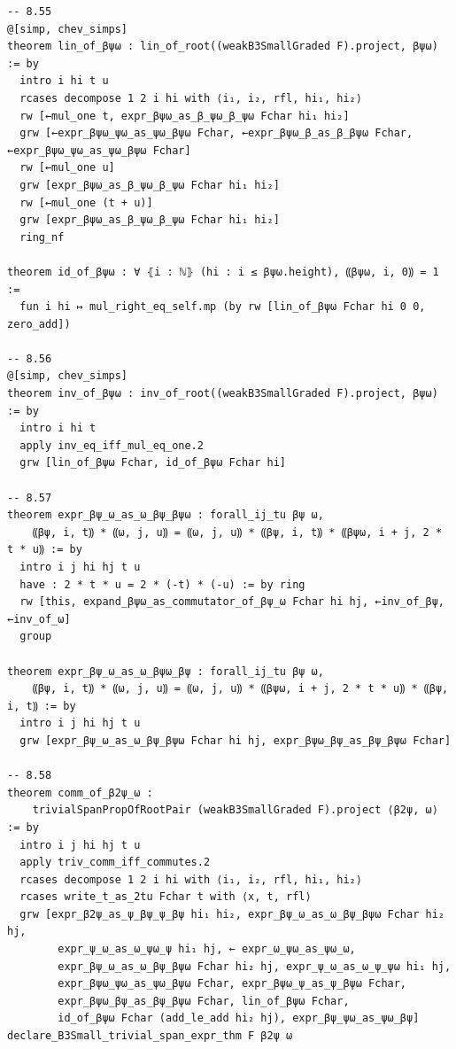 \documentclass[10pt,a4paper]{article}
\begin{document}
\begin{Verbatim}
-- 8.55
@[simp, chev_simps]
theorem lin_of_βψω : lin_of_root((weakB3SmallGraded F).project, βψω) := by
  intro i hi t u
  rcases decompose 1 2 i hi with ⟨i₁, i₂, rfl, hi₁, hi₂⟩
  rw [←mul_one t, expr_βψω_as_β_ψω_β_ψω Fchar hi₁ hi₂]
  grw [←expr_βψω_ψω_as_ψω_βψω Fchar, ←expr_βψω_β_as_β_βψω Fchar, ←expr_βψω_ψω_as_ψω_βψω Fchar]
  rw [←mul_one u]
  grw [expr_βψω_as_β_ψω_β_ψω Fchar hi₁ hi₂]
  rw [←mul_one (t + u)]
  grw [expr_βψω_as_β_ψω_β_ψω Fchar hi₁ hi₂]
  ring_nf

theorem id_of_βψω : ∀ ⦃i : ℕ⦄ (hi : i ≤ βψω.height), ⸨βψω, i, 0⸩ = 1 :=
  fun i hi ↦ mul_right_eq_self.mp (by rw [lin_of_βψω Fchar hi 0 0, zero_add])

-- 8.56
@[simp, chev_simps]
theorem inv_of_βψω : inv_of_root((weakB3SmallGraded F).project, βψω) := by
  intro i hi t
  apply inv_eq_iff_mul_eq_one.2
  grw [lin_of_βψω Fchar, id_of_βψω Fchar hi]

-- 8.57
theorem expr_βψ_ω_as_ω_βψ_βψω : forall_ij_tu βψ ω,
    ⸨βψ, i, t⸩ * ⸨ω, j, u⸩ = ⸨ω, j, u⸩ * ⸨βψ, i, t⸩ * ⸨βψω, i + j, 2 * t * u⸩ := by
  intro i j hi hj t u
  have : 2 * t * u = 2 * (-t) * (-u) := by ring
  rw [this, expand_βψω_as_commutator_of_βψ_ω Fchar hi hj, ←inv_of_βψ, ←inv_of_ω]
  group

theorem expr_βψ_ω_as_ω_βψω_βψ : forall_ij_tu βψ ω,
    ⸨βψ, i, t⸩ * ⸨ω, j, u⸩ = ⸨ω, j, u⸩ * ⸨βψω, i + j, 2 * t * u⸩ * ⸨βψ, i, t⸩ := by
  intro i j hi hj t u
  grw [expr_βψ_ω_as_ω_βψ_βψω Fchar hi hj, expr_βψω_βψ_as_βψ_βψω Fchar]

-- 8.58
theorem comm_of_β2ψ_ω :
    trivialSpanPropOfRootPair (weakB3SmallGraded F).project ⟨β2ψ, ω⟩ := by
  intro i j hi hj t u
  apply triv_comm_iff_commutes.2
  rcases decompose 1 2 i hi with ⟨i₁, i₂, rfl, hi₁, hi₂⟩
  rcases write_t_as_2tu Fchar t with ⟨x, t, rfl⟩
  grw [expr_β2ψ_as_ψ_βψ_ψ_βψ hi₁ hi₂, expr_βψ_ω_as_ω_βψ_βψω Fchar hi₂ hj,
        expr_ψ_ω_as_ω_ψω_ψ hi₁ hj, ← expr_ω_ψω_as_ψω_ω,
        expr_βψ_ω_as_ω_βψ_βψω Fchar hi₂ hj, expr_ψ_ω_as_ω_ψ_ψω hi₁ hj,
        expr_βψω_ψω_as_ψω_βψω Fchar, expr_βψω_ψ_as_ψ_βψω Fchar,
        expr_βψω_βψ_as_βψ_βψω Fchar, lin_of_βψω Fchar,
        id_of_βψω Fchar (add_le_add hi₂ hj), expr_βψ_ψω_as_ψω_βψ]
declare_B3Small_trivial_span_expr_thm F β2ψ ω


\end{Verbatim}
\end{document}
